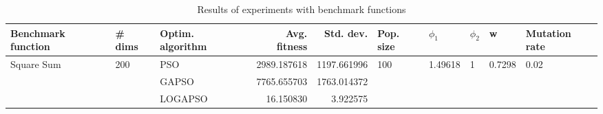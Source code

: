 \begin{table}
\centering
\caption{Results of experiments with benchmark functions}
\begin{tabular}{lllrrlllll}
\toprule
         Benchmark function &              \# dims & Optim. algorithm &  Avg. fitness &   Std. dev. &            Pop. size &               $\phi_{1}$ &         $\phi_{2}$ &                       w &         Mutation rate \\
\midrule
\multirow{3}{*}{Square Sum} & \multirow{3}{*}{200} &              PSO &   2989.187618 & 1197.661996 & \multirow{3}{*}{100} & \multirow{3}{*}{1.49618} & \multirow{3}{*}{1} & \multirow{3}{*}{0.7298} & \multirow{3}{*}{0.02} \\
                            &                      &            GAPSO &   7765.655703 & 1763.014372 &                      &                          &                    &                         &                       \\
                            &                      &          LOGAPSO &     16.150830 &    3.922575 &                      &                          &                    &                         &                       \\
\bottomrule
\end{tabular}
\end{table}
